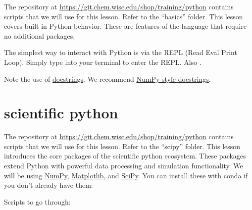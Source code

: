 \documentclass{training}
\begin{document}
The repository at \url{https://git.chem.wisc.edu/shop/training/python} contains scripts that we will use for this lesson.
Refer to the ``basics'' folder.
This lesson covers built-in Python behavior.
These are features of the language that require no additional packages.

The simplest way to interact with Python is via the REPL (Read Eval Print Loop).
Simply type  into your terminal to enter the REPL. Also .







Note the use of \href{https://www.python.org/dev/peps/pep-0257/}{docstrings}. We recommend \href{https://numpydoc.readthedocs.io/en/latest/format.html}{NumPy style docstrings}.

\clearpage
\section{scientific python}

The repository at \url{https://git.chem.wisc.edu/shop/training/python} contains scripts that we will use for this lesson.
Refer to the ``scipy'' folder.
This lesson introduces the core packages of the scientific python ecosystem.
These packages extend Python with powerful data processing and simulation functionality.
We will be using \href{https://numpy.org/}{NumPy}, \href{https://matplotlib.org/}{Matplotlib}, and \href{https://docs.scipy.org/doc/scipy/reference/}{SciPy}.
You can install these with conda if you don't already have them:

Scripts to go through:




\end{document}
